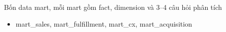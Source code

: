 \begin{frame}{Bốn data mart, mỗi mart gồm fact, dimension và 3--4 câu hỏi phân tích}
\begin{itemize}
  \item mart\_sales, mart\_fulfillment, mart\_cx, mart\_acquisition
\end{itemize}
\begin{center}\end{center}

\end{frame}

